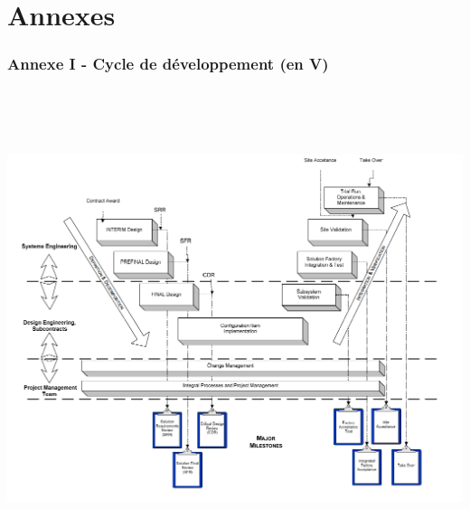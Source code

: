 \chapter*{Annexes}

\subsection*{Annexe I - Cycle de développement (en V) }

\includegraphics[height=14cm]{ressources/images/annexes/Vcycle.png}


